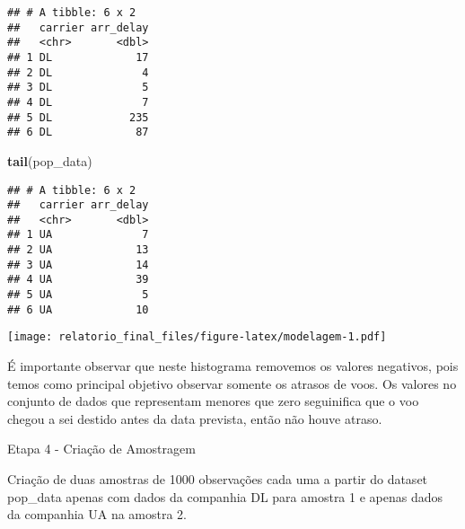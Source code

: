 \documentclass[]{article}
\newenvironment{Shaded}{\begin{snugshade}}{\end{snugshade}}
\newcommand{\DataTypeTok}[1]{\textcolor[rgb]{0.13,0.29,0.53}{#1}}
\newcommand{\DecValTok}[1]{\textcolor[rgb]{0.00,0.00,0.81}{#1}}
\newcommand{\KeywordTok}[1]{\textcolor[rgb]{0.13,0.29,0.53}{\textbf{#1}}}
\newcommand{\NormalTok}[1]{#1}
\newcommand{\OperatorTok}[1]{\textcolor[rgb]{0.81,0.36,0.00}{\textbf{#1}}}
\newcommand{\StringTok}[1]{\textcolor[rgb]{0.31,0.60,0.02}{#1}}
\begin{document}
\begin{verbatim}
## # A tibble: 6 x 2
##   carrier arr_delay
##   <chr>       <dbl>
## 1 DL             17
## 2 DL              4
## 3 DL              5
## 4 DL              7
## 5 DL            235
## 6 DL             87
\end{verbatim}

\begin{Shaded}
\begin{Highlighting}[]
\KeywordTok{tail}\NormalTok{(pop_data)}
\end{Highlighting}
\end{Shaded}

\begin{verbatim}
## # A tibble: 6 x 2
##   carrier arr_delay
##   <chr>       <dbl>
## 1 UA              7
## 2 UA             13
## 3 UA             14
## 4 UA             39
## 5 UA              5
## 6 UA             10
\end{verbatim}

\begin{Shaded}
\end{Shaded}

\texttt{[image: relatorio\_final\_files/figure-latex/modelagem-1.pdf]}

É importante observar que neste histograma removemos os valores
negativos, pois temos como principal objetivo observar somente os
atrasos de voos. Os valores no conjunto de dados que representam menores
que zero seguinifica que o voo chegou a sei destido antes da data
prevista, então não houve atraso.

Etapa 4 - Criação de Amostragem

Criação de duas amostras de 1000 observações cada uma a partir do
dataset pop\_data apenas com dados da companhia DL para amostra 1 e
apenas dados da companhia UA na amostra 2.

\begin{Shaded}
\end{Shaded}
\end{document}
